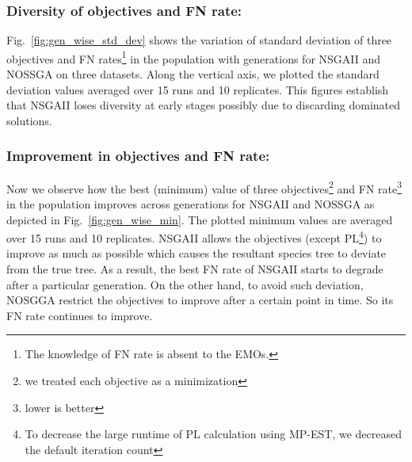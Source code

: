 \subsubsection{Diversity of objectives and FN rate:}\label{subsubsec:diversity} Fig.~\ref{fig:gen_wise_std_dev} shows the variation of standard deviation of three objectives and FN rates\footnote{The knowledge of FN rate is absent to the EMOs.} in the population with generations for NSGAII and NOSSGA on three datasets. Along the vertical axis, we plotted the standard deviation values averaged over 15 runs and 10 replicates. This figures establish that NSGAII loses diversity at early stages possibly due to discarding dominated solutions.    


\subsubsection{Improvement in objectives and FN rate:} Now we observe how the best (minimum) value of three objectives\footnote{we treated each objective as a minimization} and FN rate\footnote{lower is better} in the population improves across generations for NSGAII and NOSSGA as depicted in Fig.~\ref{fig:gen_wise_min}. The plotted minimum values are averaged over 15 runs and 10 replicates. NSGAII allows the objectives (except PL\footnote{To decrease the large runtime of PL calculation using MP-EST, we decreased the default iteration count}) to improve as much as possible which causes the resultant species tree to deviate from the true tree. As a result, the best FN rate of NSGAII starts to degrade after a particular generation. On the other hand, to avoid such deviation, NOSGGA restrict the objectives to improve after a certain point in time. So its FN rate continues to improve.
